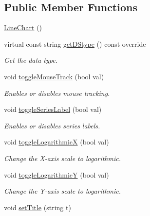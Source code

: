 \subsection*{Public Member Functions}
\begin{DoxyCompactItemize}
\item 
\mbox{\hyperlink{classbridges_1_1datastructure_1_1_line_chart_ab96c0639aca0d08c19e5d3b51a29b0a6}{Line\+Chart}} ()
\item 
virtual const string \mbox{\hyperlink{classbridges_1_1datastructure_1_1_line_chart_a431e49c31cdd5f46e978742776306dfa}{get\+D\+Stype}} () const override
\begin{DoxyCompactList}\small\item\em Get the data type. \end{DoxyCompactList}\item 
void \mbox{\hyperlink{classbridges_1_1datastructure_1_1_line_chart_aece56ea5afaf10037b698673801c4496}{toggle\+Mouse\+Track}} (bool val)
\begin{DoxyCompactList}\small\item\em Enables or disables mouse tracking. \end{DoxyCompactList}\item 
void \mbox{\hyperlink{classbridges_1_1datastructure_1_1_line_chart_a21031cd026426ab91307626ce9651c03}{toggle\+Series\+Label}} (bool val)
\begin{DoxyCompactList}\small\item\em Enables or disables series labels. \end{DoxyCompactList}\item 
void \mbox{\hyperlink{classbridges_1_1datastructure_1_1_line_chart_a4e2aa224d793793faa0c5a6edb729646}{toggle\+LogarithmicX}} (bool val)
\begin{DoxyCompactList}\small\item\em Change the X-\/axis scale to logarithmic. \end{DoxyCompactList}\item 
void \mbox{\hyperlink{classbridges_1_1datastructure_1_1_line_chart_a30c72748323d3da25974b30e11e46f48}{toggle\+LogarithmicY}} (bool val)
\begin{DoxyCompactList}\small\item\em Change the Y-\/axis scale to logarithmic. \end{DoxyCompactList}\item 
void \mbox{\hyperlink{classbridges_1_1datastructure_1_1_line_chart_ac42cf1e6348ce8ab0c3593a496a3539c}{set\+Title}} (string t)

\end{DoxyCompactItemize}
